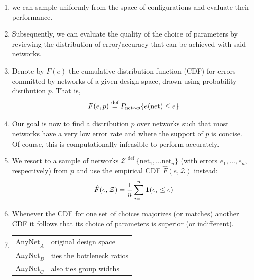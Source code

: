 \begin{enumerate}[itemsep=0.15cm]
\begin{enumerate}
    \end{enumerate}

    \item we can sample uniformly from the space of configurations and evaluate their performance. 
    
    \item Subsequently, we can evaluate the quality of the choice of parameters by reviewing the distribution of error/accuracy that can be achieved with said networks. 
    
    \item Denote by $F(e)$ the cumulative distribution function (CDF) for errors committed by networks of a given design space, drawn using probability disribution $p$. That is,
    \[
        \hfill
        F(e, p) \stackrel{\textrm{def}}{=} P_{\textrm{net} \sim p} \{e(\textrm{net}) \leq e\}
        \hfill
    \]

    \item Our goal is now to find a distribution $p$ over networks such that most networks have a very low error rate and where the support of $p$ is concise.\\
    Of course, this is computationally infeasible to perform accurately. 
    
    \item We resort to a sample of networks $\mathcal{Z} \stackrel{\textrm{def}}{=} \{\textrm{net}_1, \ldots \textrm{net}_n\}$ (with errors $e_1, \ldots, e_n$, respectively) from $p$ and use the empirical CDF $\hat{F}(e, \mathcal{Z})$ instead:
    \[
        \hfill
        \hat{F}(e, \mathcal{Z}) = \dfrac{1}{n}\dsum_{i=1}^n \mathbf{1}(e_i \leq e)
        \hfill
    \]

    \item Whenever the CDF for one set of choices majorizes (or matches) another CDF it follows that its choice of parameters is superior (or indifferent).

    \item[] 
    \begin{customTableWrapper}{1.5}
    \begin{longtable}{l p{10cm}}
        $\textrm{AnyNet}_\mathit{A}$ & original design space \\
    
        $\textrm{AnyNet}_\mathit{B}$ & ties the bottleneck ratios \\
    
        $\textrm{AnyNet}_\mathit{C}$ & also ties group widths \\
    

\end{longtable}
\end{customTableWrapper}
\end{enumerate}
